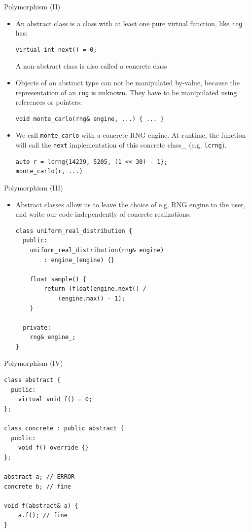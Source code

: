 \documentclass[10pt]{beamer}
\begin{document}
\begin{frame}[fragile,label={sec:orgab12fb2}]{Polymorphism (II)}
 \begin{itemize}
\item An \alert{abstract class} is a class with at least one pure virtual function, like \texttt{rng} has:
\begin{verbatim}
virtual int next() = 0;
\end{verbatim}
A \alert{non-abstract class}  is also called a \alert{concrete class}
\item Objects of an abstract type can not be manipulated by-value, because the
representation of an \texttt{rng} is unknown. They have to be manipulated using
references or pointers:
\begin{verbatim}
void monte_carlo(rng& engine, ...) { ... }
\end{verbatim}
\item We call \texttt{monte\_carlo} with a \alert{concrete} RNG engine. At runtime, the function will call the \texttt{next} implementation of this \alert{concrete}
class\_ (e.g. \texttt{lcrng}).
\begin{verbatim}
auto r = lcrng{14239, 5205, (1 << 30) - 1};
monte_carlo(r, ...)
\end{verbatim}
\end{itemize}
\end{frame}
\begin{frame}[fragile,label={sec:org15d2226}]{Polymorphism (III)}
 \begin{itemize}
\item Abstract classes allow us to leave the choice of e.g. RNG engine to the user,
and write our code independently of concrete realizations.
\begin{verbatim}
class uniform_real_distribution {
  public:
    uniform_real_distribution(rng& engine)
        : engine_(engine) {}

    float sample() {
        return (float)engine.next() /
            (engine.max() - 1); 
    }

  private:
    rng& engine_;
}
\end{verbatim}
\end{itemize}
\end{frame}

\begin{frame}[fragile,label={sec:org08f53c3}]{Polymorphism (IV)}
 \begin{verbatim}
class abstract {
  public:
    virtual void f() = 0;
};

class concrete : public abstract {
  public:
    void f() override {}
};

abstract a; // ERROR
concrete b; // fine

void f(abstract& a) {
    a.f(); // fine
}
\end{verbatim}
\end{frame}
\end{document}
